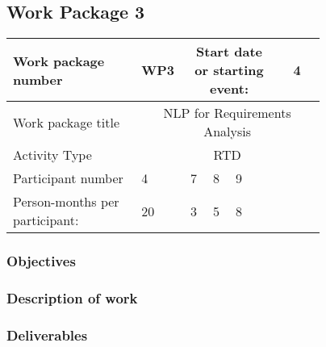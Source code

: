 \subsection{Work Package 3}

\begin{table}[hbpt]\centering
	\begin{tabular}{|p{0.35\linewidth}|p{0.06\linewidth}|p{0.06\linewidth}|p{0.06\linewidth}|
         p{0.06\linewidth}|p{0.06\linewidth}|p{0.06\linewidth}|p{0.06\linewidth}|}\hline
		 Work package number& WP3 &
		 \multicolumn{4}{|c|}{Start date or starting event:}{}&
		 \multicolumn{2}{|c|}{                        4 }{}\\\hline
		 Work package title&\multicolumn{7}{|c|}{NLP for Requirements Analysis}{}\\\hline
		 Activity Type&\multicolumn{7}{|c|}{ RTD}{}\\\hline
		 Participant number & 4 & 7 & 8 & 9 & ~ & ~ & ~ \\\hline
		 Person-months per participant: & 20 & 3 & 5 & 8 & ~ & ~ & ~ \\\hline
	\end{tabular}
\end{table}

\subsubsection{Objectives}

\subsubsection{Description of work}

\subsubsection{Deliverables}